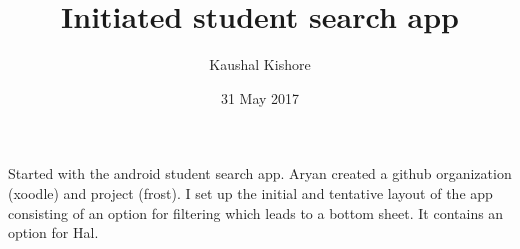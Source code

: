 \documentclass{article}
\title{Initiated student search app}
\author{Kaushal Kishore}
\date{31 May 2017}
\begin{document}
\maketitle
 Started with the android student search app. Aryan created a github organization (xoodle) and project (frost). I set up the initial and tentative
 layout of the app consisting of an option for filtering which leads to a bottom sheet. It contains an option for Hal.
\end{document}
